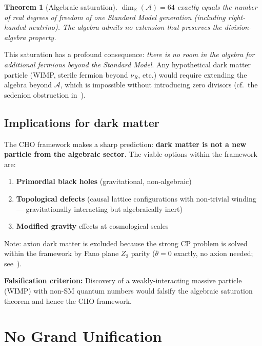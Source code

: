 \documentclass[12pt,a4paper]{article}
\newtheorem{theorem}{Theorem}
\theoremstyle{definition}
\theoremstyle{remark}
\newcommand{\Real}{\mathbb{R}}
\newcommand{\Alg}{\mathcal{A}}
\begin{document}
\begin{theorem}[Algebraic saturation]
$\dim_\Real(\Alg) = 64$ exactly equals the number of real degrees of 
freedom of one Standard Model generation (including right-handed neutrino). 
The algebra admits no extension that preserves the division-algebra property.
\end{theorem}

This saturation has a profound consequence: \emph{there is no room in the 
algebra for additional fermions beyond the Standard Model}. Any hypothetical 
dark matter particle (WIMP, sterile fermion beyond $\nu_R$, etc.) would 
require extending the algebra beyond $\Alg$, which is impossible without 
introducing zero divisors (cf.\ the sedenion obstruction in~\cite{Paper1}).

\subsection{Implications for dark matter}

The CHO framework makes a sharp prediction: \textbf{dark matter is not a 
new particle from the algebraic sector}. The viable options within the 
framework are:
\begin{enumerate}
\item \textbf{Primordial black holes} (gravitational, non-algebraic)
\item \textbf{Topological defects} (causal lattice configurations with 
non-trivial winding --- gravitationally interacting but algebraically inert)
\item \textbf{Modified gravity} effects at cosmological scales
\end{enumerate}

\noindent Note: axion dark matter is excluded because the strong CP problem 
is solved within the framework by Fano plane $Z_2$ parity 
($\bar{\theta} = 0$ exactly, no axion needed; see~\cite{Paper2}).

\noindent\textbf{Falsification criterion:} Discovery of a weakly-interacting 
massive particle (WIMP) with non-SM quantum numbers would falsify the 
algebraic saturation theorem and hence the CHO framework.

\section{No Grand Unification}
\label{sec:gut}
\end{document}
